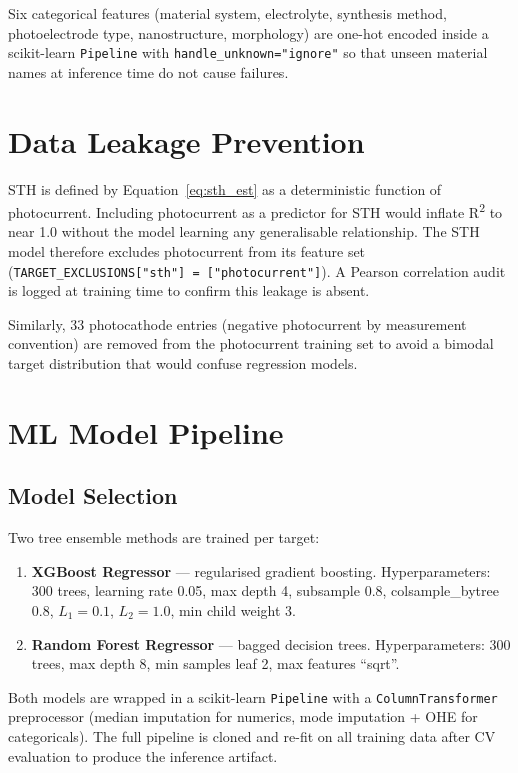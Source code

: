 Six categorical features (material system, electrolyte, synthesis method,
photoelectrode type, nanostructure, morphology) are one-hot encoded inside
a scikit-learn \texttt{Pipeline} with \texttt{handle\_unknown="ignore"}
so that unseen material names at inference time do not cause failures.

\section{Data Leakage Prevention}

STH is defined by Equation~\ref{eq:sth_est} as a deterministic function of
photocurrent.
Including photocurrent as a predictor for STH would inflate R\textsuperscript{2}
to near 1.0 without the model learning any generalisable relationship.
The STH model therefore excludes photocurrent from its feature set
(\texttt{TARGET\_EXCLUSIONS["sth"] = ["photocurrent"]}).
A Pearson correlation audit is logged at training time to confirm this leakage is
absent.

Similarly, 33 photocathode entries (negative photocurrent by measurement convention)
are removed from the photocurrent training set to avoid a bimodal target
distribution that would confuse regression models.

\section{ML Model Pipeline}

\subsection{Model Selection}

Two tree ensemble methods are trained per target:

\begin{enumerate}
  \item \textbf{XGBoost Regressor} — regularised gradient boosting.
        Hyperparameters: 300 trees, learning rate 0.05, max depth 4,
        subsample 0.8, colsample\_bytree 0.8, $L_1 = 0.1$, $L_2 = 1.0$,
        min child weight 3.

  \item \textbf{Random Forest Regressor} — bagged decision trees.
        Hyperparameters: 300 trees, max depth 8, min samples leaf 2,
        max features ``sqrt''.
\end{enumerate}

Both models are wrapped in a scikit-learn \texttt{Pipeline} with a
\texttt{ColumnTransformer} preprocessor (median imputation for numerics,
mode imputation + OHE for categoricals).
The full pipeline is cloned and re-fit on all training data after CV evaluation
to produce the inference artifact.


